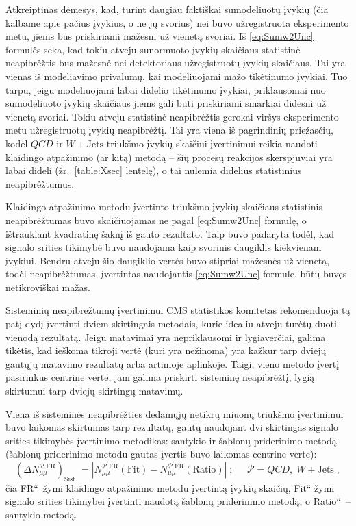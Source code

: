 \documentclass[a4paper, 12pt, oneside]{article}
\newcommand{\WJets}{W\! +\!\mathrm{Jets}}
\newcommand{\ltq}[1]{{\quotedblbase{}#1\textquotedblleft{}}}
\newcommand{\QCD}{QC\! D}
\newlength\q
\begin{document}
Atkreiptinas dėmesys, kad, turint daugiau faktiškai sumodeliuotų įvykių (čia kalbame apie pačius įvykius, o ne jų svorius)
nei buvo užregistruota eksperimento metu, jiems bus priskiriami mažesni už vienetą svoriai.
Iš \eqref{eq:Sumw2Unc} formulės seka, kad tokiu atveju sunormuoto įvykių skaičiaus statistinė neapibrėžtis bus mažesnė nei
detektoriaus užregistruotų įvykių skaičiaus.
Tai yra vienas iš modeliavimo privalumų, kai modeliuojami mažo tikėtinumo įvykiai.
Tuo tarpu, jeigu modeliuojami labai didelio tikėtinumo įvykiai, priklausomai nuo sumodeliuoto įvykių skaičiaus
jiems gali būti priskiriami smarkiai didesni už vienetą svoriai.
Tokiu atveju statistinė neapibrėžtis gerokai viršys eksperimento metu užregistruotų įvykių neapibrėžtį.
Tai yra viena iš pagrindinių priežasčių, kodėl $\QCD$ ir $\WJets$ triukšmo įvykių skaičiui įvertinimui reikia naudoti
klaidingo atpažinimo (ar kitą) metodą -- šių procesų reakcijos skerspjūviai yra labai dideli (žr.\ \ref{table:Xsec} lentelę),
o tai nulemia didelius statistinius neapibrėžtumus.

Klaidingo atpažinimo metodu įvertinto triukšmo įvykių skaičiaus statistinis neapibrėžtumas buvo skaičiuojamas ne pagal
\eqref{eq:Sumw2Unc} formulę, o ištraukiant kvadratinę šaknį iš gauto rezultato.
Taip buvo padaryta todėl, kad signalo srities tikimybė buvo naudojama kaip svorinis daugiklis kiekvienam įvykiui.
Bendru atveju šio daugiklio vertės buvo stipriai mažesnės už vienetą, todėl neapibrėžtumas, įvertintas naudojantis \eqref{eq:Sumw2Unc}
formule, būtų buvęs netikroviškai mažas.

Sisteminių neapibrėžtumų įvertinimui CMS statistikos komitetas rekomenduoja tą patį dydį įvertinti dviem skirtingais metodais,
kurie idealiu atveju turėtų duoti vienodą rezultatą.
Jeigu matavimai yra nepriklausomi ir lygiaverčiai, galima tikėtis, kad ieškoma tikroji vertė (kuri yra nežinoma) yra kažkur
tarp dviejų gautųjų matavimo rezultatų arba artimoje aplinkoje.
Taigi, vieno metodo įvertį pasirinkus centrine verte, jam galima priskirti sisteminę neapibrėžtį, lygią skirtumui tarp
dviejų skirtingų matavimų.

Viena iš sisteminės neapibrėžties dedamųjų netikrų miuonų triukšmo įvertinimui buvo laikomas skirtumas
tarp rezultatų, gautų naudojant dvi skirtingas signalo srities tikimybės įvertinimo metodikas: santykio ir šablonų
priderinimo metodą (šablonų priderinimo metodu gautas įvertis buvo laikomas centrine verte):
\begin{equation}
\label{eq:systUncFRmumu}
	(\Delta N_{\mu\mu}^{\mathcal{P} \; \mathrm{FR}})_{\mathrm{Sist.\,}} =
	\left| N_{\mu\mu}^{\mathcal{P} \; \mathrm{FR}}(\mathrm{Fit}) -
	N_{\mu\mu}^{\mathcal{P} \; \mathrm{FR}}(\mathrm{Ratio}) \right| \;  ;
	\;\;\;\;\; \mathcal{P} = \QCD, \; \WJets \; ,
\end{equation}
čia \ltq{FR}\ žymi klaidingo atpažinimo metodu įvertintą įvykių skaičių, \ltq{Fit} žymi signalo srities tikimybei
įvertinti naudotą šablonų priderinimo metodą, o \ltq{Ratio}\ -- santykio metodą.
\end{document}
